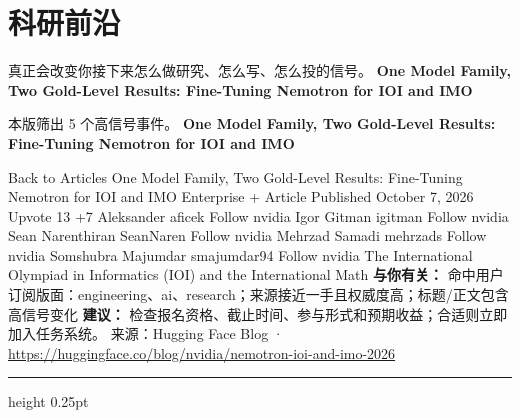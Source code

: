 \documentclass[10.5pt]{ctexart}
\begin{document}
\section*{科研前沿}
{\color{ormuted} 真正会改变你接下来怎么做研究、怎么写、怎么投的信号。}
\vspace{2mm}
{\LARGE\bfseries One Model Family, Two Gold-Level Results: Fine-Tuning Nemotron for IOI and IMO}\par
\vspace{1mm}
{\color{ormuted} 本版筛出 5 个高信号事件。}
\vspace{3mm}
{\Large\bfseries One Model Family, Two Gold-Level Results: Fine-Tuning Nemotron for IOI and IMO}\par
Back to Articles One Model Family, Two Gold-Level Results: Fine-Tuning Nemotron for IOI and IMO Enterprise + Article Published October 7, 2026 Upvote 13 +7 Aleksander aficek Follow nvidia Igor Gitman igitman Follow nvidia Sean Narenthiran SeanNaren Follow nvidia Mehrzad Samadi mehrzads Follow nvidia Somshubra Majumdar smajumdar94 Follow nvidia The International Olympiad in Informatics (IOI) and the International Math
\textbf{与你有关：} 命中用户订阅版面：engineering、ai、research；来源接近一手且权威度高；标题/正文包含高信号变化
\textbf{建议：} 检查报名资格、截止时间、参与形式和预期收益；合适则立即加入任务系统。
{\footnotesize\color{ormuted} 来源：Hugging Face Blog · \url{https://huggingface.co/blog/nvidia/nemotron-ioi-and-imo-2026}}
\vspace{4mm}
\hrule height 0.25pt
\vspace{3mm}
\end{document}
